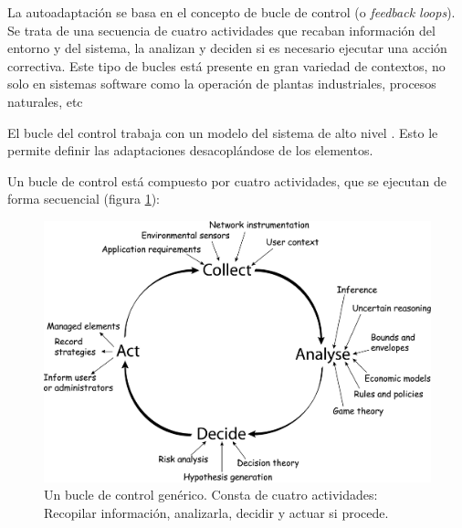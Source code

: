 La autoadaptación se basa en el concepto de bucle de control (o \emph{feedback loops}). Se trata de una secuencia de cuatro actividades que recaban información del entorno y del sistema, la analizan y deciden si es necesario ejecutar una acción correctiva.  Este tipo de bucles está presente en gran variedad de contextos, no solo en sistemas software como la operación de plantas industriales, procesos naturales, etc

El bucle del control trabaja con un modelo del sistema de alto nivel \cite{garlanIncreasingSystemDependability2003}. Esto le permite definir las adaptaciones desacoplándose de los elementos.

Un bucle de control está compuesto por cuatro actividades, que se ejecutan de forma secuencial (figura \ref{fig:bucle-control}):

\begin{figure}[h]
  \centering
  \includegraphics[scale=0.07]{01_introduccion/images/feedback-loop}
  \caption[Un bucle de control genérico. Consta de cuatro actividades: Recopilar información, analizarla, decidir y actuar si procede.]{Un bucle de control genérico. Consta de cuatro actividades: Recopilar información, analizarla, decidir y actuar si procede. \cite{dobsonSurveyAutonomicCommunications2006}}
  \label{fig:bucle-control}
\end{figure}


